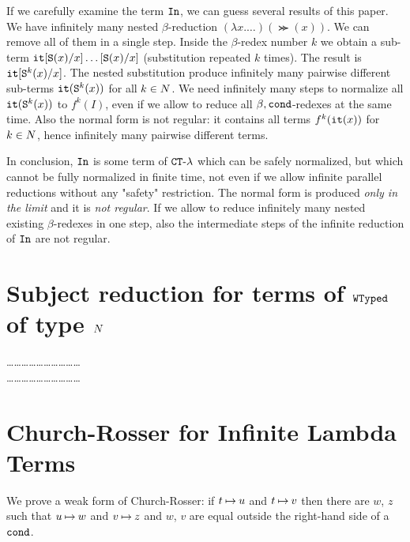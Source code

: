 \documentclass{article}
\begin{document}
If we carefully examine the term ${\tt In}$, we can guess several results of this paper.
We have infinitely many nested $\beta$-reduction $(\lambda x. \ldots)(\Succ (x))$.
We can remove all of them in a single step. Inside the $\beta$-redex number $k$ we obtain a sub-term
${\tt it}[{\tt S} (x)/x]\ldots[{\tt S} (x)/x]$ (substitution repeated $k$ times).
The result is ${\tt it}[{\tt S} ^k(x)/x] $.
The nested substitution produce infinitely many pairwise different sub-terms 
${\tt it}({\tt S} ^k(x))$ for all $k \in {N}$.
We need infinitely many steps to normalize all ${\tt it}({\tt S} ^k(x))$ to $f^k(I)$, 
even if we allow to reduce all $\beta,{\tt cond}$-redexes at the same time.
Also the normal form is not regular: it contains all terms $f^k({\tt it}(x))$ for $k \in {N}$, hence
infinitely many pairwise different terms. 

In conclusion, 
${\tt In}$ is some term of ${ {\tt CT} \mbox{-} \lambda}$ which can be safely normalized, but which 
cannot be fully normalized in finite time, not even if we allow
infinite parallel reductions without any "safety" restriction. 
The normal form is produced \emph{only in the limit}
and it is \emph{not regular}. If we allow to reduce infinitely many nested existing
$\beta$-redexes in one step, also
the intermediate steps of the infinite reduction of ${\tt In}$ are not regular.



\section{Subject reduction for terms of ${\tt WTyped}$ of type ${N}$}
\label{section-subject-reduction}
\ldots\ldots\ldots\ldots\ldots\ldots\ldots\ldots\ldots\ldots
\\
\ldots\ldots\ldots\ldots\ldots\ldots\ldots\ldots\ldots\ldots


\section{Church-Rosser for Infinite Lambda Terms}
\label{section-church-rosser}
We prove a weak form of Church-Rosser: 
if $t \mathbin{\mapsto} u$ and $t \mathbin{\mapsto} v$ then there are $w$, $z$ such that 
$u \mathbin{\mapsto} w$ and $v \mathbin{\mapsto} z$ and $w$, $v$ are equal outside the right-hand side of a ${\tt cond}$.
\end{document}

